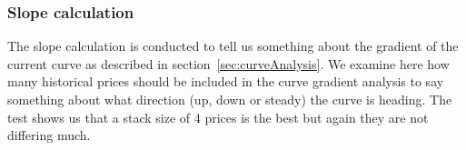 \begin{table}[H]
\centering  %
\caption{Number of historical prices to include in the skewness calculation} %
\label{table:SkewnessTest} %
\end{table}

\subsubsection{Slope calculation}
The slope calculation is conducted to tell us something about the gradient of the current curve as described in section~\ref{sec:curveAnalysis}. We examine here how many historical prices should be included in the curve gradient analysis to say something about what direction (up, down or steady) the curve is heading. The test shows us that a stack size of 4 prices is the best but again they are not differing much.

